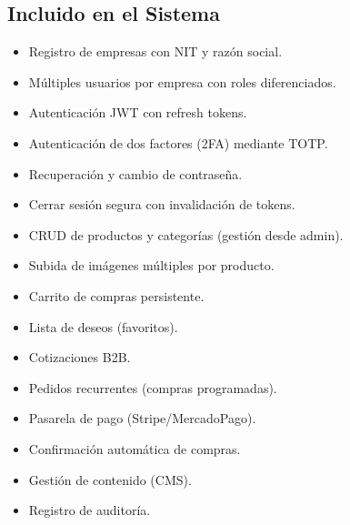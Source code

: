 \documentclass[12pt,a4paper,oneside]{book}
\begin{document}
\subsection{Incluido en el Sistema}
\begin{itemize}
    \item Registro de empresas con NIT y razón social.
    \item Múltiples usuarios por empresa con roles diferenciados.
    \item Autenticación JWT con refresh tokens.
    \item Autenticación de dos factores (2FA) mediante TOTP.
    \item Recuperación y cambio de contraseña.
    \item Cerrar sesión segura con invalidación de tokens.
    \item CRUD de productos y categorías (gestión desde admin).
    \item Subida de imágenes múltiples por producto.
    \item Carrito de compras persistente.
    \item Lista de deseos (favoritos).
    \item Cotizaciones B2B.
    \item Pedidos recurrentes (compras programadas).
    \item Pasarela de pago (Stripe/MercadoPago).
    \item Confirmación automática de compras.
    \item Gestión de contenido (CMS).
    \item Registro de auditoría.
\end{itemize}
\end{document}
